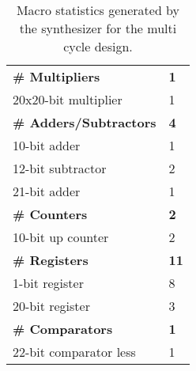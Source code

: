 \documentclass[paper=usletter, fontsize=12pt]{article}
\begin{document}
        \begin{table}[h]
            \caption{Macro statistics generated by the synthesizer for the
            multi cycle design.}
            \label{table:multimacro}
            \centering
            \begin{tabular*}{250pt}{ m{20em}m{1cm} }
                \textbf{\# Multipliers}         & \textbf{1} \\
                 20x20-bit multiplier           & 1 \\
                \textbf{\# Adders/Subtractors}  & \textbf{4} \\
                 10-bit adder                   & 1 \\
                 12-bit subtractor              & 2 \\
                 21-bit adder                   & 1 \\
                \textbf{\# Counters}            & \textbf{2} \\
                 10-bit up counter              & 2 \\
                \textbf{\# Registers}           & \textbf{11} \\
                 1-bit register                 & 8 \\
                 20-bit register                & 3 \\
                \textbf{\# Comparators}         & \textbf{1} \\
                 22-bit comparator less         & 1 \\
            \end{tabular*}

        \end{table}
\end{document}
